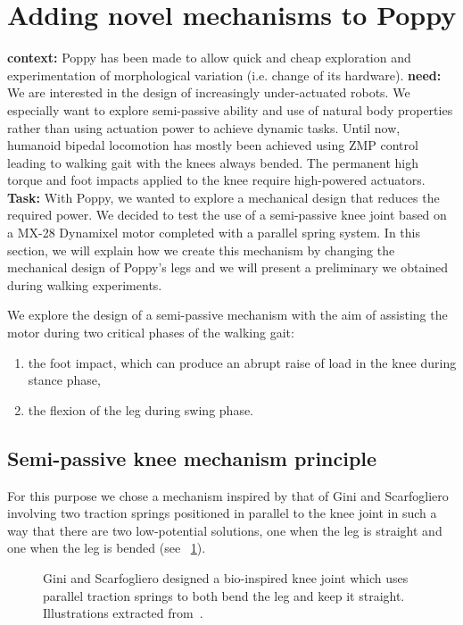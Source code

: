 \section{Adding novel mechanisms to Poppy} %
\label{sec:morphology-add-mechanism}

\textbf{context:} Poppy has been made to allow quick and cheap exploration and experimentation of morphological variation (i.e. change of its hardware).
\textbf{need:}
We are interested in the design of increasingly under-actuated robots. We especially want to explore semi-passive ability and use of natural body properties rather than using actuation power to achieve dynamic tasks. Until now,  humanoid bipedal locomotion has mostly been achieved using ZMP control leading to walking gait with the knees always bended. The permanent high torque and foot impacts applied to the knee require high-powered actuators.
\textbf{Task:} With Poppy, we wanted to explore a mechanical design that reduces the required power. We decided to test the use of a semi-passive knee joint based on a MX-28 Dynamixel motor completed with a parallel spring system.
In this section, we will explain how we create this mechanism by changing the mechanical design of Poppy's legs and we will present a preliminary  we obtained during walking experiments.

We explore the design of a semi-passive mechanism with the aim of assisting the motor during two critical phases of the walking gait:
\begin{enumerate}
    \item the foot impact, which can produce an abrupt raise of load in the knee during stance phase,
    \item the flexion of the leg during swing phase.
\end{enumerate}

\subsection{Semi-passive knee mechanism principle} %
For this purpose we chose a mechanism inspired by that of Gini and Scarfogliero~\parencite{gini2009new} involving two traction springs positioned in parallel to the knee joint in such a way that there are two low-potential solutions, one when the leg is straight and one when the leg is bended (see \figurename~\ref{fig:Gini_knee}).

\begin{figure}[]
\centering
    \hfil
    \caption{Gini and Scarfogliero designed a bio-inspired knee joint which uses parallel traction springs to both bend the leg and keep it straight. Illustrations extracted from~\parencite{gini2009new}.}
    \label{fig:Gini_knee}
\end{figure}

